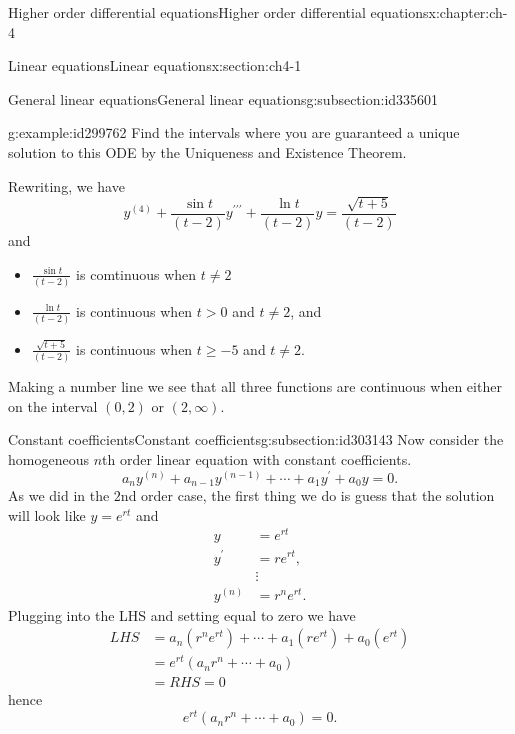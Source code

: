 \documentclass[oneside,10pt,]{book}
\numberwithin{equation}{section}
\numberwithin{equation}{section}
\newcommand{\amp}{&}
\begin{document}
\begin{chapterptx}{Higher order differential equations}{}{Higher order differential equations}{}{}{x:chapter:ch-4}
\begin{sectionptx}{Linear equations}{}{Linear equations}{}{}{x:section:ch4-1}
\begin{subsectionptx}{General linear equations}{}{General linear equations}{}{}{g:subsection:id335601}
\begin{example}{}{g:example:id299762}
Find the intervals where you are guaranteed a unique solution to this ODE by the Uniqueness and Existence Theorem.%
\par
Rewriting, we have%
\begin{equation*}
y^{(4)}+\frac{\sin t}{(t-2)}y^{\prime\prime\prime}+\frac{\ln t}{(t-2)}y=\frac{\sqrt{t+5}}{(t-2)}
\end{equation*}
and%
\begin{itemize}[label=\textbullet]
\item{}\(\frac{\sin t}{(t-2)}\) is comtinuous when \(t\neq2\)%
\item{}\(\frac{\ln t}{(t-2)}\) is continuous when \(t>0\) and \(t\neq2\), and%
\item{}\(\frac{\sqrt{t+5}}{(t-2)}\) is continuous when \(t\geq-5\) and \(t\neq2\).%
\end{itemize}
Making a number line we see that all three functions are continuous when either on the interval \((0,2)\) or \((2,\infty)\).%
\end{example}
\end{subsectionptx}
%
%
\typeout{************************************************}
\typeout{************************************************}
%
\begin{subsectionptx}{Constant coefficients}{}{Constant coefficients}{}{}{g:subsection:id303143}
Now consider the homogeneous \(n\)th order linear equation with constant coefficients.%
\begin{equation*}
a_{n}y^{(n)}+a_{n-1}y^{(n-1)}+\cdots+a_{1}y^{\prime}+a_{0}y=0.
\end{equation*}
As we did in the \(2\)nd order case, the first thing we do is guess that the solution will look like \(y=e^{rt}\) and%
\begin{align*}
y \amp =e^{rt}\\
y^{\prime} \amp =re^{rt},\\
\amp \vdots\\
y^{(n)} \amp =r^{n}e^{rt}.
\end{align*}
Plugging into the LHS and setting equal to zero we have%
\begin{align*}
LHS \amp =a_{n}\left(r^{n}e^{rt}\right)+\cdots+a_{1}\left(re^{rt}\right)+a_{0}\left(e^{rt}\right)\\
\amp =e^{rt}\left(a_{n}r^{n}+\cdots+a_{0}\right)\\
\amp =RHS=0
\end{align*}
hence%
\begin{equation*}
e^{rt}\left(a_{n}r^{n}+\cdots+a_{0}\right)=0.

\end{equation*}
\end{subsectionptx}
\end{sectionptx}
\end{chapterptx}
\end{document}
